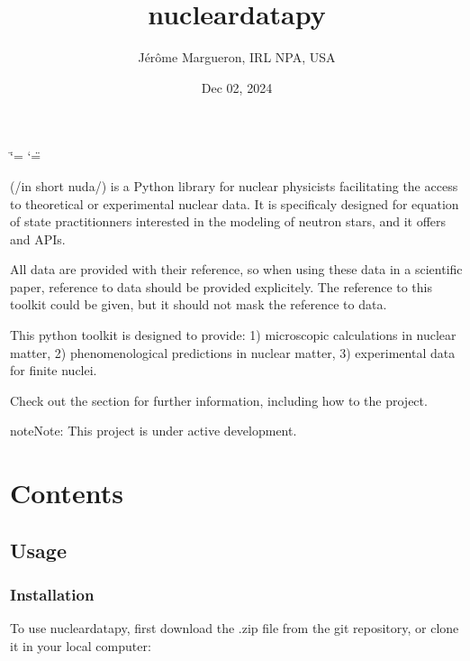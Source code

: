 \documentclass[letterpaper,10pt,english]{sphinxmanual}
\title{nucleardatapy}
\date{Dec 02, 2024}
\author{Jérôme Margueron, IRL NPA, USA}
\begin{document}
\ifdefined\shorthandoff
  \ifnum\catcode`\=\string=\active\shorthandoff{=}\fi
  \ifnum\catcode`\"=\active{}\fi
\fi

\pagestyle{empty}
\sphinxmaketitle
\pagestyle{plain}
\sphinxtableofcontents
\pagestyle{normal}
\label{\detokenize{index::doc}}


\sphinxAtStartPar
{} (/in short nuda/) is a Python library for nuclear physicists facilitating the access to theoretical or experimental nuclear data. It is specificaly designed for equation of state practitionners interested in the modeling of neutron stars, and it offers  and  APIs.

\sphinxAtStartPar
All data are provided with their reference, so when using these data in a scientific paper, reference to data should be provided explicitely. The reference to this toolkit could be given, but it should not mask the reference to data.

\sphinxAtStartPar
This python toolkit is designed to provide:
1) microscopic calculations in nuclear matter,
2) phenomenological predictions in nuclear matter,
3) experimental data for finite nuclei.

\sphinxAtStartPar
Check out the {\hyperref[\detokenize{source/usage::doc}]{}} section for further information, including how to
{\hyperref[\detokenize{source/usage:installation}]{}} the project.

\begin{sphinxadmonition}{note}{Note:}
\sphinxAtStartPar
This project is under active development.
\end{sphinxadmonition}


\chapter{Contents}
\label{\detokenize{index:contents}}
\sphinxstepscope


\section{Usage}
\label{\detokenize{source/usage:usage}}\label{\detokenize{source/usage::doc}}

\subsection{Installation}
\label{\detokenize{source/usage:installation}}\label{\detokenize{source/usage:id1}}
\sphinxAtStartPar
To use nucleardatapy, first download the .zip file from the git repository, or clone it in your local computer:
\end{document}
